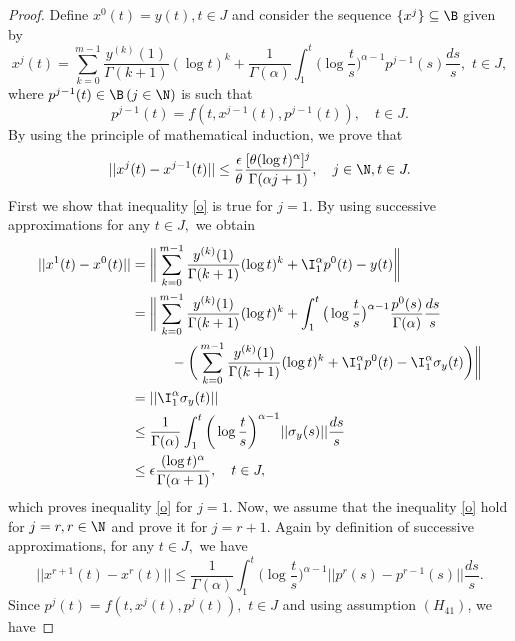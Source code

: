 \begin{proof}
\noindent Define $x^{0}(t)=y(t),t\in{J}$ and consider the sequence $\{x^{j}\}\subseteq\B$ given by
\begin{equation}\label{m}
x^{j}(t)=\sum_{k=0}^{m-1}\frac{y^{(k)}(1)}{\Gamma(k+1)}(\log{t})^k+\frac{1}{\Gamma(\alpha)}\int_{1}^{t}\bigg(\log{\frac{t}{s}}\bigg)^{\alpha-1}p^{j-1}(s)\frac{ds}{s},\,\, t\in{J},
\end{equation}
where $p^{j-1}(t)\in\B \, (j\in\N)$ is such that
\begin{equation}\label{n}
p^{j-1}(t)=f(t,x^{j-1}(t),p^{j-1}(t)),\quad t\in{J}.
\end{equation}
By using the principle of mathematical induction, we prove that
\begin{equation}\label{o}
||x^{j}(t)-x^{j-1}(t)||\leq\frac{\epsilon}{\theta}\frac{[\theta(\log{t})^{\alpha}]^{j}}{\Gamma(\alpha j+1)},\quad j\in\N,t\in{J}.
\end{equation}
First we show that inequality \eqref{o} is true for $j=1.$ By using successive approximations for any $t\in{J},$ we obtain
\begin{align*}
||x^{1}(t)-x^{0}(t)||&=\bigg{\|}\sum_{k=0}^{m-1}\frac{y^{(k)}(1)}{\Gamma(k+1)}(\log{t})^k+{\I_{1}^{\alpha}}p^{0}(t)-y(t)\bigg{\|}\\
&=\bigg{\|}\sum_{k=0}^{m-1}\frac{y^{(k)}(1)}{\Gamma(k+1)}(\log{t})^k+\int_{1}^{t}\big(\log{\frac{t}{s}}\big)^{\alpha-1}\frac{p^{0}(s)}{\Gamma(\alpha)}\frac{ds}{s}\\
&\hspace{1cm}-\bigg(\sum_{k=0}^{m-1}\frac{y^{(k)}(1)}{\Gamma(k+1)}(\log{t})^k+\I_{1}^{\alpha}p^{0}(t)-\I_{1}^{\alpha}\sigma_y(t)\bigg)\bigg{\|}\\
&=||\I_{1}^{\alpha}\sigma_y(t)||\\
&\leq\frac{1}{\Gamma(\alpha)}\int_{1}^{t}\bigg(\log{\frac{t}{s}}\bigg)^{\alpha-1}||\sigma_y(s)||\frac{ds}{s}\\
&\leq\epsilon\frac{(\log{t})^{\alpha}}{\Gamma(\alpha+1)},\quad t\in{J},
\end{align*}
which proves inequality \eqref{o} for $j=1.$ Now, we assume that the inequality \eqref{o} hold for $j=r,r\in\N$ and prove it for $j=r+1.$ Again by definition of successive approximations, for any $t\in{J},$ we have
\begin{equation}\label{p}
||x^{r+1}(t)-x^{r}(t)||\leq\frac{1}{\Gamma(\alpha)}\int_{1}^{t}\bigg(\log{\frac{t}{s}}\bigg)^{\alpha-1}||p^r(s)-p^{r-1}(s)||\frac{ds}{s}.
\end{equation}
Since $p^{j}(t)=f(t,x^{j}(t),p^{j}(t)),\,\, t\in{J}$ and using assumption $(H_{41})$, we have

\end{proof}
